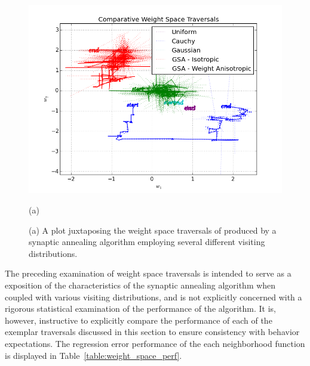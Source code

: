 \documentclass[11pt]{afthesis}
\begin{document}
	

   	\begin{figure}[ht!]
   		
		\centering
		\centerline{\includegraphics[width = 6in]{figures/wieght_space_comparative.png}}
		\centerline{(a)}\medskip

   		\caption{(a) A plot juxtaposing the weight space traversals of produced by a synaptic annealing algorithm employing several different visiting distributions.}
   		\label{fig:weight_space_comparitive}
   		
   		
   	\end{figure}
   	
	The preceding examination of weight space traversals is intended to serve as a exposition of the characteristics of the synaptic annealing algorithm when coupled with various visiting distributions, and is not explicitly concerned with a rigorous statistical examination of the performance of the algorithm. It is, however, instructive to explicitly compare the performance of each of the exemplar traversals discussed in this section to ensure consistency with behavior expectations. The regression error performance of the each neighborhood function is displayed in Table~\ref{table:weight_space_perf}. 
\end{document}
